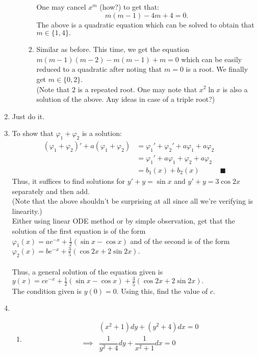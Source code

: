 \documentclass{article}
\begin{document}
\begin{enumerate}[label = Q.\arabic*.]
\begin{enumerate}[label = (\alph*)]
\begin{enumerate}[label = (\roman*)]
			One may cancel $x^m$ (how?) to get that:
			\[m(m - 1) - 4m + 4 = 0.\]
			The above is a quadratic equation which can be solved to obtain that $m \in \{1, 4\}.$
			\item Similar as before. This time, we get the equation $m(m - 1)(m - 2) - m(m - 1) + m = 0$ which can be easily reduced to a quadratic after noting that $m = 0$ is a root. We finally get $m \in \{0, 2\}.$ \\
			(Note that $2$ is a repeated root. One may note that $x^2\ln x$ is also a solution of the above. Any ideas in case of a triple root?)
		\end{enumerate}	
	\end{enumerate}
	\item Just do it. \checkmark
	\item To show that $\varphi_1 + \varphi_2$ is a solution:\\
	\begin{align*} 
		(\varphi_1 + \varphi_2)' + a(\varphi_1 + \varphi_2) &= \varphi_1' + \varphi_2' + a\varphi_1 + a\varphi_2\\
		&= \varphi_1' + a\varphi_1 + \varphi_2 + a\varphi_2\\
		&= b_1(x) + b_2(x) & \blacksquare
	\end{align*}
	Thus, it suffices to find solutions for $y' + y = \sin x$ and $y' + y = 3\cos 2x$ separately and then add.\\
	(Note that the above shouldn't be surprising at all since all we're verifying is linearity.)\\
	Either using linear ODE method or by simple observation, get that the solution of the first equation is of the form $\varphi_1(x) = ae^{-x} + \frac{1}{2}(\sin x - \cos x)$ and of the second is of the form $\varphi_2(x) = be^{-x} + \frac{3}{5}(\cos2x + 2\sin 2x).$\\~\\
	Thus, a general solution of the equation given is $y(x) = ce^{-x} + \frac{1}{2}(\sin x - \cos x) + \frac{3}{5}(\cos2x + 2\sin 2x).$\\
	The condition given is $y(0) = 0.$ Using this, find the value of $c.$
	\item 
	\begin{enumerate}[label = (\roman*)] 
		\item 
		\begin{align*} 
			& (x^2 + 1)dy + (y^2 + 4)dx = 0\\
			\implies & \dfrac{1}{y^2 + 4}dy + \dfrac{1}{x^2 + 1}dx = 0\\~\\

\end{align*}
\end{enumerate}
\end{enumerate}
\end{document}
